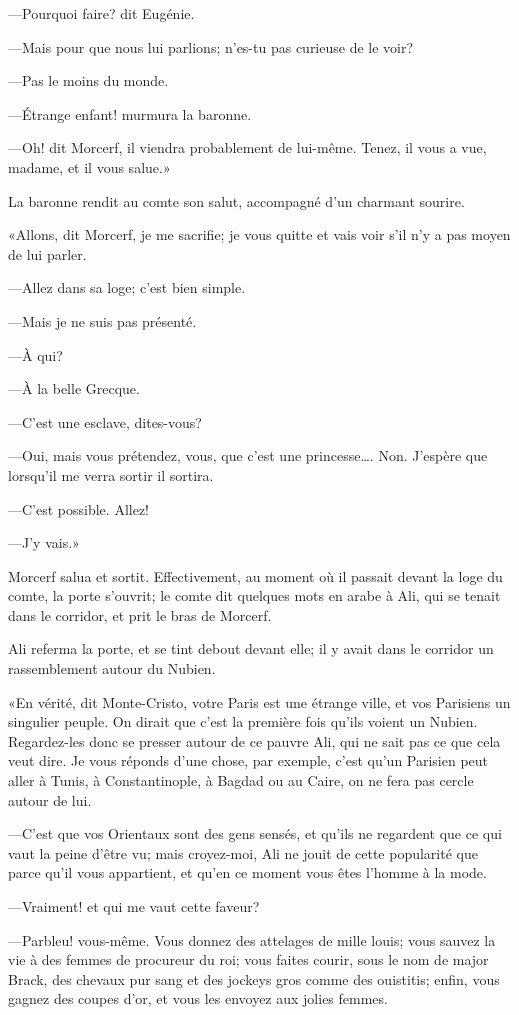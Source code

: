 —Pourquoi faire? dit Eugénie. 

—Mais pour que nous lui parlions; n'es-tu pas curieuse de le voir? 

—Pas le moins du monde. 

—Étrange enfant! murmura la baronne. 

—Oh! dit Morcerf, il viendra probablement de lui-même. Tenez, il vous a vue, madame, et il vous salue.» 

La baronne rendit au comte son salut, accompagné d'un charmant sourire. 

«Allons, dit Morcerf, je me sacrifie; je vous quitte et vais voir s'il n'y a pas moyen de lui parler. 

—Allez dans sa loge; c'est bien simple. 

—Mais je ne suis pas présenté. 

—À qui? 

—À la belle Grecque. 

—C'est une esclave, dites-vous? 

—Oui, mais vous prétendez, vous, que c'est une princesse\dots. Non. J'espère que lorsqu'il me verra sortir il sortira. 

—C'est possible. Allez! 

—J'y vais.» 

Morcerf salua et sortit. Effectivement, au moment où il passait devant la loge du comte, la porte s'ouvrit; le comte dit quelques mots en arabe à Ali, qui se tenait dans le corridor, et prit le bras de Morcerf. 

Ali referma la porte, et se tint debout devant elle; il y avait dans le corridor un rassemblement autour du Nubien. 

«En vérité, dit Monte-Cristo, votre Paris est une étrange ville, et vos Parisiens un singulier peuple. On dirait que c'est la première fois qu'ils voient un Nubien. Regardez-les donc se presser autour de ce pauvre Ali, qui ne sait pas ce que cela veut dire. Je vous réponds d'une chose, par exemple, c'est qu'un Parisien peut aller à Tunis, à Constantinople, à Bagdad ou au Caire, on ne fera pas cercle autour de lui. 

—C'est que vos Orientaux sont des gens sensés, et qu'ils ne regardent que ce qui vaut la peine d'être vu; mais croyez-moi, Ali ne jouit de cette popularité que parce qu'il vous appartient, et qu'en ce moment vous êtes l'homme à la mode. 

—Vraiment! et qui me vaut cette faveur? 

—Parbleu! vous-même. Vous donnez des attelages de mille louis; vous sauvez la vie à des femmes de procureur du roi; vous faites courir, sous le nom de major Brack, des chevaux pur sang et des jockeys gros comme des ouistitis; enfin, vous gagnez des coupes d'or, et vous les envoyez aux jolies femmes. 

